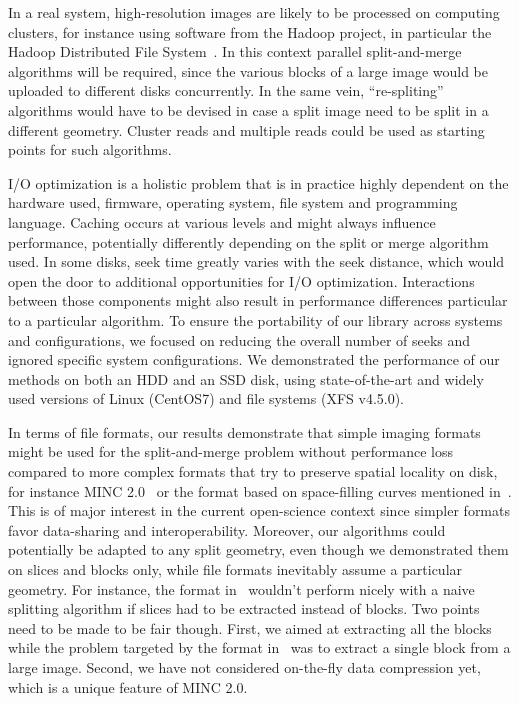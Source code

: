\documentclass[10pt, conference, compsocconf]{IEEEtran}
\begin{document}



In a real system, high-resolution images are likely to be processed on
computing clusters, for instance using software from the Hadoop
project, in particular the Hadoop Distributed File
System~\cite{shvachko2010hadoop}. In this context parallel split-and-merge algorithms
will be required, since the various blocks of a large image would be
uploaded to different disks concurrently. In the same vein,
``re-spliting'' algorithms would have to be devised in case a split
image need to be split in a different geometry. Cluster reads and
multiple reads could be used as starting points for such algorithms.

I/O optimization is a holistic problem that is in practice highly
dependent on the hardware used, firmware, operating system, file
system and programming language. Caching occurs at various levels and
might always influence performance, potentially differently depending
on the split or merge algorithm used. In some disks, seek time greatly
varies with the seek distance, which would open the door to additional
opportunities for I/O optimization. Interactions between those
components might also result in performance differences particular to
a particular algorithm. To ensure the portability of our library
across systems and configurations, we focused on reducing the overall
number of seeks and ignored specific system configurations. We
demonstrated the performance of our methods on both an HDD and an SSD
disk, using state-of-the-art and widely used versions of Linux
(CentOS7) and file systems (XFS v4.5.0).

In terms of file formats, our results demonstrate that simple imaging
formats might be used for the split-and-merge problem without
performance loss compared to more complex formats that try to preserve
spatial locality on disk, for instance MINC 2.0~\cite{vincent2016minc}
or the format based on space-filling curves mentioned
in~\cite{burns2013open}. This is of major interest in the current
open-science context since simpler formats favor data-sharing and
interoperability.  Moreover, our algorithms could potentially be
adapted to any split geometry, even though we demonstrated them on
slices and blocks only, while file formats inevitably assume a
particular geometry. For instance, the format in~\cite{burns2013open}
wouldn't perform nicely with a naive splitting algorithm if slices had
to be extracted instead of blocks.  Two points need to be made to be
fair though. First, we aimed at extracting all the blocks while the
problem targeted by the format in~\cite{burns2013open} was to extract
a single block from a large image. Second, we have not considered
on-the-fly data compression yet, which is a unique feature of MINC
2.0.
\end{document}
